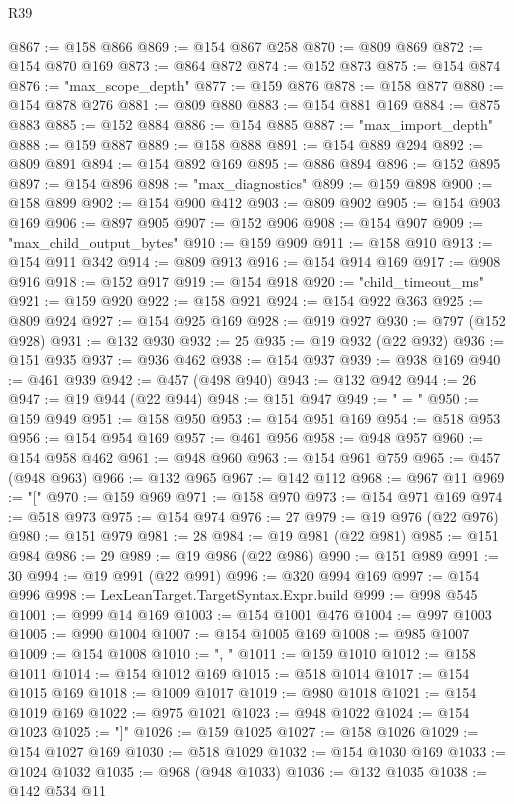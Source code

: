 \begin{lexlean}{R39}
\begin{coremodule}
@867 := @158 @866
@869 := @154 @867 @258
@870 := @809 @869
@872 := @154 @870 @169
@873 := @864 @872
@874 := @152 @873
@875 := @154 @874
@876 := "max_scope_depth"
@877 := @159 @876
@878 := @158 @877
@880 := @154 @878 @276
@881 := @809 @880
@883 := @154 @881 @169
@884 := @875 @883
@885 := @152 @884
@886 := @154 @885
@887 := "max_import_depth"
@888 := @159 @887
@889 := @158 @888
@891 := @154 @889 @294
@892 := @809 @891
@894 := @154 @892 @169
@895 := @886 @894
@896 := @152 @895
@897 := @154 @896
@898 := "max_diagnostics"
@899 := @159 @898
@900 := @158 @899
@902 := @154 @900 @412
@903 := @809 @902
@905 := @154 @903 @169
@906 := @897 @905
@907 := @152 @906
@908 := @154 @907
@909 := "max_child_output_bytes"
@910 := @159 @909
@911 := @158 @910
@913 := @154 @911 @342
@914 := @809 @913
@916 := @154 @914 @169
@917 := @908 @916
@918 := @152 @917
@919 := @154 @918
@920 := "child_timeout_ms"
@921 := @159 @920
@922 := @158 @921
@924 := @154 @922 @363
@925 := @809 @924
@927 := @154 @925 @169
@928 := @919 @927
@930 := @797 (@152 @928)
@931 := @132 @930
@932 := 25
@935 := @19 @932 (@22 @932)
@936 := @151 @935
@937 := @936 @462
@938 := @154 @937
@939 := @938 @169
@940 := @461 @939
@942 := @457 (@498 @940)
@943 := @132 @942
@944 := 26
@947 := @19 @944 (@22 @944)
@948 := @151 @947
@949 := " = "
@950 := @159 @949
@951 := @158 @950
@953 := @154 @951 @169
@954 := @518 @953
@956 := @154 @954 @169
@957 := @461 @956
@958 := @948 @957
@960 := @154 @958 @462
@961 := @948 @960
@963 := @154 @961 @759
@965 := @457 (@948 @963)
@966 := @132 @965
@967 := @142 @112
@968 := @967 @11
@969 := "["
@970 := @159 @969
@971 := @158 @970
@973 := @154 @971 @169
@974 := @518 @973
@975 := @154 @974
@976 := 27
@979 := @19 @976 (@22 @976)
@980 := @151 @979
@981 := 28
@984 := @19 @981 (@22 @981)
@985 := @151 @984
@986 := 29
@989 := @19 @986 (@22 @986)
@990 := @151 @989
@991 := 30
@994 := @19 @991 (@22 @991)
@996 := @320 @994 @169
@997 := @154 @996
@998 := LexLeanTarget.TargetSyntax.Expr.build
@999 := @998 @545
@1001 := @999 @14 @169
@1003 := @154 @1001 @476
@1004 := @997 @1003
@1005 := @990 @1004
@1007 := @154 @1005 @169
@1008 := @985 @1007
@1009 := @154 @1008
@1010 := ", "
@1011 := @159 @1010
@1012 := @158 @1011
@1014 := @154 @1012 @169
@1015 := @518 @1014
@1017 := @154 @1015 @169
@1018 := @1009 @1017
@1019 := @980 @1018
@1021 := @154 @1019 @169
@1022 := @975 @1021
@1023 := @948 @1022
@1024 := @154 @1023
@1025 := "]"
@1026 := @159 @1025
@1027 := @158 @1026
@1029 := @154 @1027 @169
@1030 := @518 @1029
@1032 := @154 @1030 @169
@1033 := @1024 @1032
@1035 := @968 (@948 @1033)
@1036 := @132 @1035
@1038 := @142 @534 @11

\end{coremodule}
\end{lexlean}
